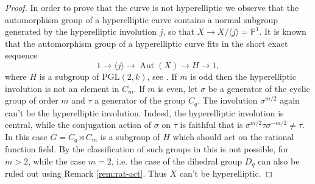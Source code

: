 \documentclass[11pt,letterpaper]{amsart}
\theoremstyle{definition}
\DeclareMathOperator\Aut{Aut}
\begin{document}
\begin{proof}
In order to prove that the curve is not hyperelliptic we observe that the automorphism group of a hyperelliptic curve contains a normal subgroup generated by the hyperelliptic involution $j$, so that $X \rightarrow X/\langle j \rangle=\mathbb{P}^1$. 
It is known that the automorphism group of a hyperelliptic curve fits in the short exact sequence 
\begin{equation}
\label{eq:hyp-aut}
1 \rightarrow \langle j \rangle  \rightarrow \Aut(X) \rightarrow H \rightarrow 1, 
\end{equation}
where $H$ is a subgroup of $\mathrm{PGL}(2,k)$, see
 \cite{BraStich86}. If 
$m$ is odd then the hyperelliptic involution is not an element in $C_m$.  If $m$ is even, let $\sigma$ be a generator of the cyclic group of order $m$ and $\tau$
a generator of the group $C_q$. The involution  $\sigma^{m/2}$ again can't be the hyperelliptic involution. Indeed, the hyperelliptic involution is central, while the conjugation action of $\sigma$ on $\tau$ is faithful that is $\sigma^{m/2} \tau \sigma^{-m/2} \neq \tau$.
In this case $G=C_q \rtimes C_m$ is a subgroup of $H$ which should  act on  the rational function field. By the classification of such groups in \cite[Th. 1]{Val-Mad:80} this is not possible, for $m>2$, while the case $m=2$, i.e. the case of the dihedral group $D_q$ can also be ruled out using Remark \ref{rem:rat-act}.
Thus $X$ can't be hyperelliptic. 



\end{proof}
\end{document}
